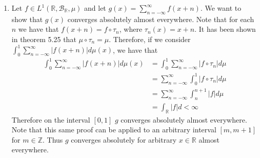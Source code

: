 \documentclass[12pt, letterpaper]{article}
\newcommand{\Z}{\mathbb{Z}}
\newcommand{\R}{\mathbb{R}}
\begin{document}
\begin{enumerate}
\begin{align*}
			&= 1
		\end{align*}
		\begin{align*}
		\int_Y (\int_X f(\cdot,y)d \mu) d \nu &= \int_Y f(y,y) \mu(\{y\}) + f(y+1,y)\mu(\{y+1\}) d\nu\\
		&= \sum_{y=1}^\infty (f(y,y) + f(y+1,y))\nu(\{y\})\\
		&= \sum_{y=1}^\infty (1 - 1)\\
		&= 0
		\end{align*}
	\item Let $f \in L^1(\R, \mathcal{B}_\R, \mu)$ and let $ g(x) = \sum_{n=-\infty}^\infty f(x+n)$.  We want to show that $g(x)$ converges absolutely almost everywhere.
	Note that for each $n$ we have that $f(x+n) = f \circ \tau_n$, where 
	$\tau_n(x) = x + n$.  It has been shown in theorem 5.25 that $\mu \circ \tau_n = \mu$.  Therefore, if we consider $\int_0^1 \sum_{n=-\infty}^\infty |f(x+n)| d \mu(x)$, we have that 
	\begin{align*}	
	\int_0^1 \sum_{n=-\infty}^\infty |f(x+n)| d \mu(x) &= \int_0^1 \sum_{n=-\infty}^\infty |f \circ \tau_n|d\mu\\
	&= \sum_{n=-\infty}^\infty \int_0^1 |f \circ \tau_n| d \mu\\
	&= \sum_{n=-\infty}^\infty \int_{n}^{n+1} |f| d \mu\\
	&= \int_\R |f| d 
	< \infty
	\end{align*}
	Therefore on the interval $[0,1]$ $g$ converges absolutely almost everywhere.   Note that 
	this same proof can be applied to an arbitrary interval $[m,m+1]$ for $m \in \Z$.
	Thus $g$ converges absolutely for arbitrary $x \in \R$ almost everywhere.
	
\end{enumerate}
\end{document}
